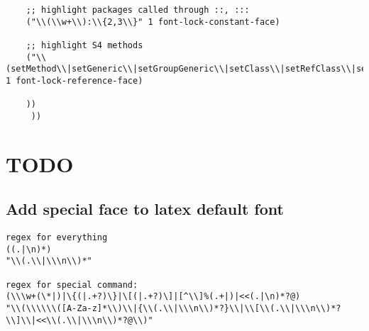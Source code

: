 \documentclass[11pt]{article}
\begin{document}
\begin{verbatim}
	;; highlight packages called through ::, :::
	("\\(\\w+\\):\\{2,3\\}" 1 font-lock-constant-face)

	;; highlight S4 methods
	("\\(setMethod\\|setGeneric\\|setGroupGeneric\\|setClass\\|setRefClass\\|setReplaceMethod\\)" 1 font-lock-reference-face)

	))
	 ))

\end{verbatim}

\section{{\bfseries\sffamily TODO} }
\label{sec:org88b2556}
\subsection{Add special face to latex default font}
\label{sec:org6c80e8c}

\begin{verbatim}
regex for everything
((.|\n)*)
"\\(.\\|\\\n\\)*"

regex for special command:
(\\\w+(\*|)|\{(|.+?)\}|\[(|.+?)\]|[^\\]%(.+|)|<<(.|\n)*?@)
"\\(\\\\\\([A-Za-z]*\\)\\|{\\(.\\|\\\n\\)*?}\\|\\[\\(.\\|\\\n\\)*?\\]\\|<<\\(.\\|\\\n\\)*?@\\)"

\end{verbatim}
\end{document}
